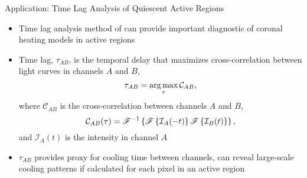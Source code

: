 \begin{block}{Application: Time Lag Analysis of Quiescent Active Regions}

\begin{itemize}
    \item Time lag analysis method of \citet{viall_evidence_2012} can provide \alert{important diagnostic of coronal heating models in active regions} \citep[e.g][]{barnes_understanding_2019}
    \item Time lag, $\tau_{AB}$, is the temporal delay that maximizes cross-correlation between light curves in channels $A$ and $B$,
    \begin{equation*}
        \tau_{AB} = \operatorname*{arg\,max}_{\tau}\mathcal{C}_{AB},
    \end{equation*}
    where $\mathcal{C}_{AB}$ is the cross-correlation between channels $A$ and $B$,
    \begin{equation*}
        \mathcal{C}_{AB}(\tau) = \mathscr{F}^{-1}\left\{\mathscr{F}\left\{\mathcal{I}_A(-t)\right\}\mathscr{F}\left\{\mathcal{I}_B(t)\right\}\right\},
    \end{equation*}
    and $\mathcal{I}_A(t)$ is the intensity in channel $A$ \citep{barnes_understanding_2019}
    \item $\tau_{AB}$ provides proxy for cooling time between channels, can reveal large-scale cooling patterns if calculated for each pixel in an active region
\end{itemize}


\end{block}
